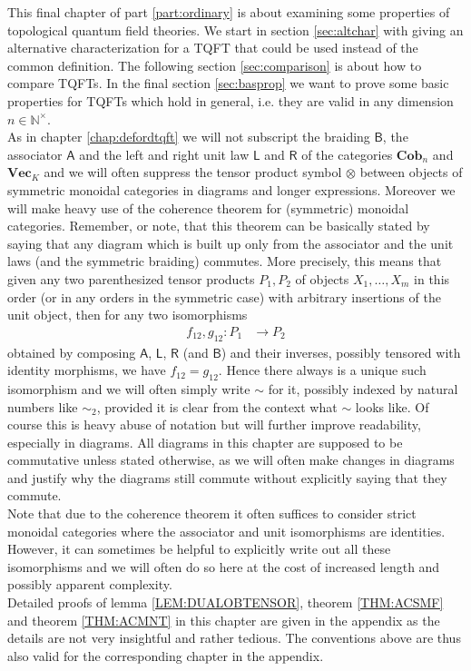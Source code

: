 This final chapter of part \ref{part:ordinary} is about examining some properties of topological quantum field theories. We start in section \ref{sec:altchar} with giving an alternative characterization for a TQFT that could be used instead of the common definition. The following section \ref{sec:comparison} is about how to compare TQFTs. In the final section \ref{sec:basprop} we want to prove some basic properties for TQFTs which hold in general, i.e. they are valid in any dimension $n \in \mathbb{N}^{\times}$.
\\
As in chapter \ref{chap:defordtqft} we will not subscript the braiding $\mathsf{B}$, the associator $\mathsf{A}$ and the left and right unit law $\mathsf{L}$ and $\mathsf{R}$ of the categories $\mathbf{Cob}_{n}$ and $\mathbf{Vec}_{K}$ and we will often suppress the tensor product symbol $\otimes$ between objects of symmetric monoidal categories in diagrams and longer expressions. Moreover we will make heavy use of the coherence theorem for (symmetric) monoidal categories. Remember, or note, that this theorem can be basically stated by saying that any diagram which is built up only from the associator and the unit laws (and the symmetric braiding) commutes. More precisely, this means that given any two parenthesized tensor products $P_{1},P_{2}$ of objects $X_{1}, \ldots, X_{m}$ in this order (or in any orders in the symmetric case) with arbitrary insertions of the unit object, then for any two isomorphisms
\begin{align*}
  f_{12},g_{12}
  \colon
  P_{1}
  &\to
  P_{2}
\end{align*}
obtained by composing $\mathsf{A}$, $\mathsf{L}$, $\mathsf{R}$ (and $\mathsf{B}$) and their inverses, possibly tensored with identity morphisms, we have $f_{12} = g_{12}$. Hence there always is a unique such isomorphism and we will often simply write $\sim$ for it, possibly indexed by natural numbers like $\sim_{2}$, provided it is clear from the context what $\sim$ looks like. Of course this is heavy abuse of notation but will further improve readability, especially in diagrams. All diagrams in this chapter are supposed to be commutative unless stated otherwise, as we will often make changes in diagrams and justify why the diagrams still commute without explicitly saying that they commute.
\\
Note that due to the coherence theorem it often suffices to consider strict monoidal categories where the associator and unit isomorphisms are identities. However, it can sometimes be helpful to explicitly write out all these isomorphisms and we will often do so here at the cost of increased length and possibly apparent complexity.
\\
Detailed proofs of lemma \ref{LEM:DUALOBTENSOR}, theorem \ref{THM:ACSMF} and theorem \ref{THM:ACMNT} in this chapter are given in the appendix as the details are not very insightful and rather tedious. The conventions above are thus also valid for the corresponding chapter in the appendix.
